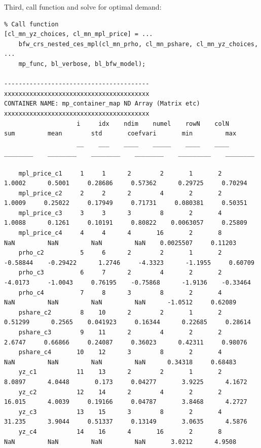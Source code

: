 \documentclass[
]{book}
\begin{document}
Third, call function and solve for optimal demand:

\begin{verbatim}
% Call function
[cl_mn_yz_choices, cl_mn_mpl_price] = ...
    bfw_crs_nested_ces_mpl(cl_mn_prho, cl_mn_pshare, cl_mn_yz_choices, ...
    mp_func, bl_verbose, bl_bfw_model);

----------------------------------------
xxxxxxxxxxxxxxxxxxxxxxxxxxxxxxxxxxxxxxxx
CONTAINER NAME: mp_container_map ND Array (Matrix etc)
xxxxxxxxxxxxxxxxxxxxxxxxxxxxxxxxxxxxxxxx
                    i     idx    ndim    numel    rowN    colN      sum         mean        std       coefvari       min         max   
                    __    ___    ____    _____    ____    ____    ________    ________    ________    ________    _________    ________

    mpl_price_c1     1     1      2        2       1       2        1.0002      0.5001     0.28686     0.57362      0.29725     0.70294
    mpl_price_c2     2     2      2        4       2       2        1.0009     0.25022     0.17949     0.71731     0.080381     0.50351
    mpl_price_c3     3     3      3        8       2       4        1.0088      0.1261     0.10191     0.80822    0.0063057     0.25809
    mpl_price_c4     4     4      4       16       2       8           NaN         NaN         NaN         NaN    0.0025507     0.11203
    prho_c2          5     6      2        2       1       2      -0.58844    -0.29422      1.2746     -4.3323      -1.1955     0.60709
    prho_c3          6     7      2        4       2       2       -4.0173     -1.0043     0.76195    -0.75868      -1.9136    -0.33464
    prho_c4          7     8      3        8       2       4           NaN         NaN         NaN         NaN      -1.0512     0.62089
    pshare_c2        8    10      2        2       1       2       0.51299      0.2565    0.041923     0.16344      0.22685     0.28614
    pshare_c3        9    11      2        4       2       2        2.6747     0.66866     0.24087     0.36023      0.42311     0.98076
    pshare_c4       10    12      3        8       2       4           NaN         NaN         NaN         NaN      0.34318     0.68483
    yz_c1           11    13      2        2       1       2        8.0897      4.0448       0.173     0.04277       3.9225      4.1672
    yz_c2           12    14      2        4       2       2        16.015      4.0039     0.19166     0.04787       3.8468      4.2727
    yz_c3           13    15      3        8       2       4        31.235      3.9044     0.51337     0.13149       3.0635      4.5876
    yz_c4           14    16      4       16       2       8           NaN         NaN         NaN         NaN       3.0212      4.9508


\end{verbatim}
\end{document}
